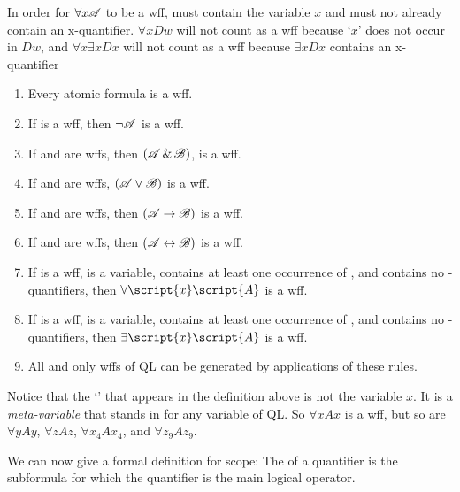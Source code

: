 In order for $\forall x\mathscr{A}$ to be a wff,  must contain the variable $x$ and must not already contain an x-quantifier. $\forall x Dw$ will not count as a wff because `$x$' does not occur in $Dw$, and $\forall x \exists x Dx$ will not count as a wff because $\exists x Dx$ contains an x-quantifier

\begin{enumerate}
\item Every atomic formula is a wff.
\item If  is a wff, then $\neg\mathscr{A}$ is a wff.
\item If  and  are wffs, then $(\mathscr{A}\,\&\,\mathscr{B})$, is a wff.
\item If  and  are wffs, $(\mathscr{A}\vee\mathscr{B})$ is a wff.
\item If  and  are wffs, then $(\mathscr{A}\rightarrow\mathscr{B})$ is a wff.
\item If  and  are wffs, then $(\mathscr{A}\leftrightarrow\mathscr{B})$ is a wff.
\item If  is a wff,  is a variable,  contains at least one occurrence of , and  contains no -quantifiers, then $\forall\script{x}\script{A}$ is a wff.
\item If  is a wff,  is a variable,  contains at least one occurrence of , and  contains no -quantifiers, then $\exists\script{x}\script{A}$ is a wff.
\item All and only wffs of QL can be generated by applications of these rules.
\end {enumerate}

Notice that the `' that appears in the definition above is not the variable $x$. It is a \emph{meta-variable} that stands in for any variable of QL. So $\forall xAx$ is a wff, but so are $\forall yAy$, $\forall zAz$, $\forall x_4Ax_4$, and $\forall z_9Az_9$.

We can now give a formal definition for scope: The  of a quantifier is the subformula for which the quantifier is the main logical operator. 



